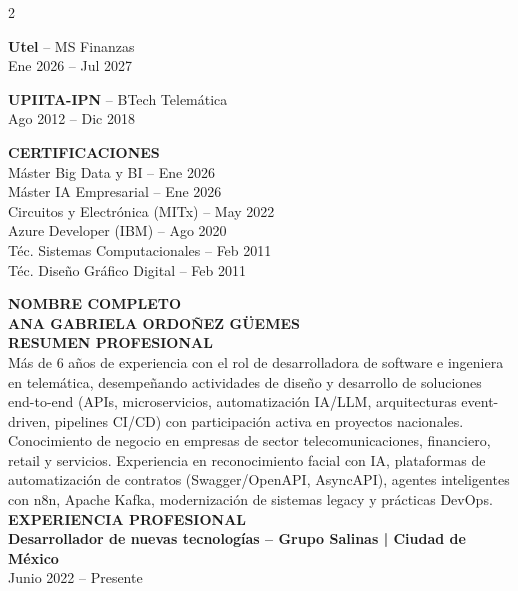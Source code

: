 \documentclass[11pt,a4paper]{article}
\newcommand{\titulocaps}[1]{\textcolor{softtekAccent}{\textbf{\MakeUppercase{#1}}}\\[0.10em]}
\begin{document}
\begin{paracol}{2}
\begin{leftcolumn}
\textbf{Utel} -- MS Finanzas\\
Ene 2026 -- Jul 2027
\vspace{0.2em}

\textbf{UPIITA-IPN} -- BTech Telemática\\
Ago 2012 -- Dic 2018
\medskip

\titulocaps{Certificaciones}
Máster Big Data y BI -- Ene 2026\\
Máster IA Empresarial -- Ene 2026\\
Circuitos y Electrónica (MITx) -- May 2022\\
Azure Developer (IBM) -- Ago 2020\\
Téc. Sistemas Computacionales -- Feb 2011\\
Téc. Diseño Gráfico Digital -- Feb 2011
\end{leftcolumn}
\switchcolumn
\titulocaps{Nombre completo}
\textbf{ANA GABRIELA ORDOÑEZ GÜEMES}\\[0.6em]

\titulocaps{Resumen profesional}
Más de 6 años de experiencia con el rol de desarrolladora de software e ingeniera en telemática, desempeñando actividades de diseño y desarrollo de soluciones end-to-end (APIs, microservicios, automatización IA/LLM, arquitecturas event-driven, pipelines CI/CD) con participación activa en proyectos nacionales. Conocimiento de negocio en empresas de sector telecomunicaciones, financiero, retail y servicios. Experiencia en reconocimiento facial con IA, plataformas de automatización de contratos (Swagger/OpenAPI, AsyncAPI), agentes inteligentes con n8n, Apache Kafka, modernización de sistemas legacy y prácticas DevOps.\\[0.8em]

\titulocaps{Experiencia profesional}

\textbf{\textcolor{softtekAccent}{Desarrollador de nuevas tecnologías -- Grupo Salinas | Ciudad de México}}\\
Junio 2022 -- Presente


\end{paracol}
\end{document}
